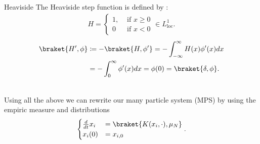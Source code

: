 \begin{example}{Heaviside}
The Heaviside step function is defined by :
\begin{align*}
  H = \begin{cases}
    1, &\text{ if }x\ge 0 \\
    0 &\text{ if } x<0
  \end{cases} \in  L_{\text{loc}}^{1} 
.\end{align*}
\begin{align*}
  \braket{H',\phi } &\coloneqq  - \braket{H,\phi'} = - \int_{-\infty}^{\infty} H(x)\phi'(x) dx\\
                    &= - \int_0^{\infty} \phi'(x) dx = \phi(0)  =\braket{\delta,\phi }
.\end{align*}
\begin{figure}[h]
  \begin{center}
  \end{center}
\end{figure}
\end{example}
\hspace{0mm}\\
Using all the above we can rewrite our many particle system  (MPS) by using the empiric measure and distributions 
\begin{align*}
  \begin{cases}
    \frac{d}{dt} x_i &=  \braket{K(x_i,\cdot) , \mu_N} \\ 
    x_i(0) &= x_{i,0}
  \end{cases}
.\end{align*}
